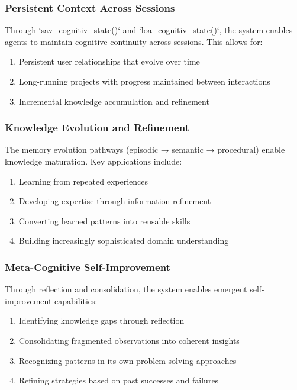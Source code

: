 \documentclass[12pt,a4paper]{article}
\begin{document}
\subsubsection*{Persistent Context Across Sessions}

Through `sav\1\_cognitiv\1\_state()` and `loa\1\_cognitiv\1\_state()`, the system enables agents to maintain cognitive continuity across sessions. This allows for:

\begin{enumerate}[label=\arabic*.]
    \item Persistent user relationships that evolve over time
    \item Long-running projects with progress maintained between interactions
    \item Incremental knowledge accumulation and refinement
\end{enumerate}

\subsubsection*{Knowledge Evolution and Refinement}

The memory evolution pathways (episodic → semantic → procedural) enable knowledge maturation. Key applications include:

\begin{enumerate}[label=\arabic*.]
    \item Learning from repeated experiences
    \item Developing expertise through information refinement
    \item Converting learned patterns into reusable skills
    \item Building increasingly sophisticated domain understanding
\end{enumerate}

\subsubsection*{Meta-Cognitive Self-Improvement}

Through reflection and consolidation, the system enables emergent self-improvement capabilities:

\begin{enumerate}[label=\arabic*.]
    \item Identifying knowledge gaps through reflection
    \item Consolidating fragmented observations into coherent insights
    \item Recognizing patterns in its own problem-solving approaches
    \item Refining strategies based on past successes and failures
\end{enumerate}
\end{document}
